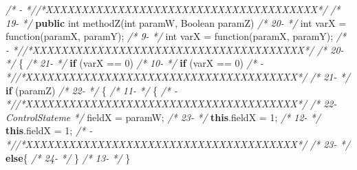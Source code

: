 \documentclass[
]{article}
\newenvironment{Shaded}{\begin{snugshade}}{\end{snugshade}}
\newcommand{\BuiltInTok}[1]{#1}
\newcommand{\CommentTok}[1]{\textcolor[rgb]{0.56,0.35,0.01}{\textit{#1}}}
\newcommand{\DataTypeTok}[1]{\textcolor[rgb]{0.13,0.29,0.53}{#1}}
\newcommand{\DecValTok}[1]{\textcolor[rgb]{0.00,0.00,0.81}{#1}}
\newcommand{\FunctionTok}[1]{\textcolor[rgb]{0.00,0.00,0.00}{#1}}
\newcommand{\KeywordTok}[1]{\textcolor[rgb]{0.13,0.29,0.53}{\textbf{#1}}}
\newcommand{\NormalTok}[1]{#1}
\begin{document}
\begin{landscape}
\begin{Shaded}
\begin{Highlighting}[]
\CommentTok{/*   -                 *//*XXXXXXXXXXXXXXXXXXXXXXXXXXXXXXXXXXXXXX*/}                     \CommentTok{/* 19-                 */}    \KeywordTok{public} \DataTypeTok{int} \FunctionTok{methodZ}\NormalTok{(}\DataTypeTok{int}\NormalTok{ paramW, }\BuiltInTok{Boolean}\NormalTok{ paramZ)             }
\CommentTok{/* 20-                 */}        \DataTypeTok{int}\NormalTok{ varX = }\FunctionTok{function}\NormalTok{(paramX, paramY);                          }\CommentTok{/*  9-                 */}        \DataTypeTok{int}\NormalTok{ varX = }\FunctionTok{function}\NormalTok{(paramX, paramY);                           }
\CommentTok{/*   -                 *//*XXXXXXXXXXXXXXXXXXXXXXXXXXXXXXXXXXXXXX*/}                     \CommentTok{/* 20-                 */}\NormalTok{    \{                                                          }
\CommentTok{/* 21-                 */}        \KeywordTok{if}\NormalTok{ (varX == }\DecValTok{0}\NormalTok{)                                         }\CommentTok{/* 10-                 */}        \KeywordTok{if}\NormalTok{ (varX == }\DecValTok{0}\NormalTok{)                                         }
\CommentTok{/*   -                 *//*XXXXXXXXXXXXXXXXXXXXXXXXXXXXXXXXXXXXXX*/}                     \CommentTok{/* 21-                 */}        \KeywordTok{if}\NormalTok{ (paramZ)                                            }
\CommentTok{/* 22-                 */}\NormalTok{        \{                                                      }\CommentTok{/* 11-                 */}\NormalTok{        \{                                                      }
\CommentTok{/*   -                 *//*XXXXXXXXXXXXXXXXXXXXXXXXXXXXXXXXXXXXXX*/}                     \CommentTok{/* 22-ControlStateme   */}\NormalTok{            fieldX = paramW;                                   }
\CommentTok{/* 23-                 */}            \KeywordTok{this}\NormalTok{.}\FunctionTok{fieldX}\NormalTok{ = }\DecValTok{1}\NormalTok{;                                   }\CommentTok{/* 12-                 */}            \KeywordTok{this}\NormalTok{.}\FunctionTok{fieldX}\NormalTok{ = }\DecValTok{1}\NormalTok{;                                   }
\CommentTok{/*   -                 *//*XXXXXXXXXXXXXXXXXXXXXXXXXXXXXXXXXXXXXX*/}                     \CommentTok{/* 23-                 */}        \KeywordTok{else}\NormalTok{\{                                                  }
\CommentTok{/* 24-                 */}\NormalTok{        \}                                                                }\CommentTok{/* 13-                 */}\NormalTok{        \}                                                                  }

\end{Highlighting}
\end{Shaded}
\end{landscape}
\end{document}
